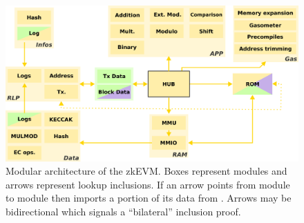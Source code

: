 \begin{figure}
    \includegraphics[width = \textwidth]{../img/zkevm_better_arrow_heads.png}
\caption{Modular architecture of the zkEVM. Boxes represent modules and arrows represent lookup inclusions. If an arrow points from module  to module  then  imports a portion of its data from .  Arrows may be bidirectional which signals a ``bilateral'' inclusion proof.}
\end{figure}

